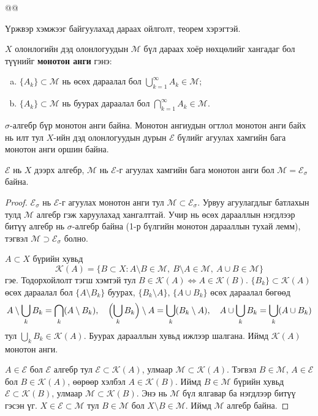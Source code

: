 @@

Үржвэр хэмжээг байгуулахад дараах ойлголт, теорем хэрэгтэй.
\begin{dfn}\label{monclassdef}
$X$ олонлогийн дэд олонлогуудын $\mathcal{M}$ бүл дараах хоёр нөхцөлийг хангадаг бол түүнийг \textbf{монотон анги} гэнэ:
\begin{enumerate}[a)]
\item $\{A_k\}\subset\mathcal{M}$ нь өсөх дараалал бол $\bigcup\limits_{k=1}^{\infty}A_k\in\mathcal{M}$;
\item $\{A_k\}\subset\mathcal{M}$ нь буурах дараалал бол $\bigcap\limits_{k=1}^{\infty}A_k\in\mathcal{M}$.
\end{enumerate}
\end{dfn}
$\sigma$-алгебр бүр монотон анги байна. Монотон ангиудын огтлол монотон анги байх нь илт тул $X$-ийн дэд олонлогуудын дурын $\mathscr{E}$ бүлийг агуулах хамгийн бага монотон анги оршин байна.
\begin{thm}\label{monclass}
$\mathscr{E}$ нь $X$ дээрх алгебр, $\mathcal{M}$ нь $\mathscr{E}$-г агуулах хамгийн бага монотон анги бол $\mathcal{M}=\mathscr{E}_{\sigma}$ байна.
\end{thm}
\begin{proof}
$\mathscr{E}_{\sigma}$ нь $\mathscr{E}$-г агуулах монотон анги тул $\mathcal{M}\subset\mathscr{E}_{\sigma}$. Урвуу агуулагдлыг батлахын тулд $\mathcal{M}$ алгебр гэж харуулахад хангалттай. Учир нь өсөх дарааллын нэгдлээр битүү алгебр нь $\sigma$-алгебр байна (1-р бүлгийн монотон дарааллын тухай лемм), тэгвэл $\mathcal{M}\supset\mathscr{E}_{\sigma}$ болно.

$A\subset X$ бүрийн хувьд
$$\mathcal{K}(A)=\{B\subset X: A\setminus B\in\mathcal{M},\ B\setminus A\in\mathcal{M},\ A\cup B\in\mathcal{M}\}$$
гэе. Тодорхойлолт тэгш хэмтэй тул $B\in\mathcal{K}(A)\Longleftrightarrow A\in\mathcal{K}(B)$. $\{B_k\}\subset\mathcal{K}(A)$ өсөх дараалал бол $\{A\setminus B_k\}$ буурах, $\{B_k\setminus A\}$, $\{A\cup B_k\}$ өсөх дараалал бөгөөд
$$A\setminus\bigcup_kB_k=\bigcap_k(A\setminus B_k),\quad \Bigl(\bigcup_kB_k\Bigr)\setminus A=\bigcup_k(B_k\setminus A),\quad A\cup\bigcup_kB_k=\bigcup_k(A\cup B_k)$$
тул $\bigcup_kB_k\in\mathcal{K}(A)$. Буурах дарааллын хувьд ижлээр шалгана. Иймд $\mathcal{K}(A)$ монотон анги.

$A\in\mathscr{E}$ бол $\mathscr{E}$ алгебр тул $\mathscr{E}\subset\mathcal{K}(A)$, улмаар $\mathcal{M}\subset\mathcal{K}(A)$. Тэгвэл $B\in\mathcal{M}$, $A\in\mathscr{E}$ бол $B\in\mathcal{K}(A)$, өөрөөр хэлбэл $A\in\mathcal{K}(B)$. Иймд $B\in\mathcal{M}$ бүрийн хувьд $\mathscr{E}\subset\mathcal{K}(B)$, улмаар $\mathcal{M}\subset\mathcal{K}(B)$. Энэ нь $\mathcal{M}$ бүл ялгавар ба нэгдлээр битүү гэсэн үг. $X\in\mathscr{E}\subset\mathcal{M}$ тул $B\in\mathcal{M}$ бол $X\setminus B\in\mathcal{M}$. Иймд $\mathcal{M}$ алгебр байна.
\end{proof}
